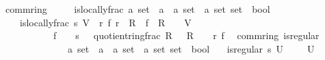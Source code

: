 \documentclass[12pt]{scrartcl}
\begin{document}
\begin{isabelle}
\isamarkupfalse%
\ {\isacharparenleft}{\kern0pt}\ comm{\isacharunderscore}{\kern0pt}ring{\isacharparenright}{\kern0pt}\ \isanewline
\ \ \ \ is{\isacharunderscore}{\kern0pt}locally{\isacharunderscore}{\kern0pt}frac{\isacharcolon}{\kern0pt}{\isacharcolon}{\kern0pt}\ {\isachardoublequoteopen}{\isacharparenleft}{\kern0pt}{\isacharprime}{\kern0pt}a\ set\ {\isasymRightarrow}\ {\isacharparenleft}{\kern0pt}{\isacharprime}{\kern0pt}a\ {\isasymtimes}\ {\isacharprime}{\kern0pt}a{\isacharparenright}{\kern0pt}\ set{\isacharparenright}{\kern0pt}\ {\isasymRightarrow}\ {\isacharprime}{\kern0pt}a\ set\ set\ {\isasymRightarrow}\ bool{\isachardoublequoteclose}\isanewline
\ \ \ \ \ {\isachardoublequoteopen}is{\isacharunderscore}{\kern0pt}locally{\isacharunderscore}{\kern0pt}frac\ s\ V\ {\isasymequiv}\ {\isacharparenleft}{\kern0pt}{\isasymexists}r\ f{\isachardot}{\kern0pt}\ r\ {\isasymin}\ R\ {\isasymand}\ f\ {\isasymin}\ R\ {\isasymand}\ {\isacharparenleft}{\kern0pt}{\isasymforall}{\isasymqq}\ {\isasymin}\ V{\isachardot}{\kern0pt}\ \isanewline
\ \ \ \ \ \ \ \ \ \ \ \ f\ {\isasymnotin}\ {\isasymqq}\ {\isasymand}\ s\ {\isasymqq}\ {\isacharequal}{\kern0pt}\ quotient{\isacharunderscore}{\kern0pt}ring{\isachardot}{\kern0pt}frac\ {\isacharparenleft}{\kern0pt}R\ {\isasymsetminus}\ {\isasymqq}{\isacharparenright}{\kern0pt}\ R\ {\isacharparenleft}{\kern0pt}{\isacharplus}{\kern0pt}{\isacharparenright}{\kern0pt}\ {\isacharparenleft}{\kern0pt}{\isasymcdot}{\isacharparenright}{\kern0pt}\ {\isasymzero}\ r\ f{\isacharparenright}{\kern0pt}{\isacharparenright}{\kern0pt}{\isachardoublequoteclose}\isanewline
\isanewline
{}\isamarkupfalse%
\ {\isacharparenleft}{\kern0pt}\ comm{\isacharunderscore}{\kern0pt}ring{\isacharparenright}{\kern0pt}\ is{\isacharunderscore}{\kern0pt}regular\isanewline
\ \ \ \ \ \ \ \ \ \ \ \ \ \ {\isacharcolon}{\kern0pt}{\isacharcolon}{\kern0pt}\ {\isachardoublequoteopen}{\isacharparenleft}{\kern0pt}{\isacharprime}{\kern0pt}a\ set\ {\isasymRightarrow}\ {\isacharparenleft}{\kern0pt}{\isacharprime}{\kern0pt}a\ {\isasymtimes}\ {\isacharprime}{\kern0pt}a{\isacharparenright}{\kern0pt}\ set{\isacharparenright}{\kern0pt}\ {\isasymRightarrow}\ {\isacharprime}{\kern0pt}a\ set\ set\ {\isasymRightarrow}\ bool{\isachardoublequoteclose}\isanewline
\ \ \ {\isachardoublequoteopen}is{\isacharunderscore}{\kern0pt}regular\ s\ U\ {\isasymequiv}\ {\isasymforall}{\isasympp}{\isachardot}{\kern0pt}\ {\isasympp}\ {\isasymin}\ U\ {\isasymlongrightarrow}\ \isanewline

\end{isabelle}
\end{document}
